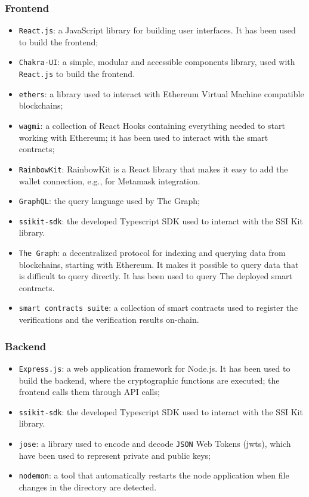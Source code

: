 \subsubsection{Frontend}
\begin{itemize}
    \setlength\itemsep{-0.1em}
    \item \texttt{React.js}: a JavaScript library for building user interfaces. It
    has been used to build the frontend;
    \item \texttt{Chakra-UI}: a simple, modular and accessible components library,
    used with \texttt{React.js} to build the frontend.
    \item \texttt{ethers}: a library used to interact with Ethereum Virtual
    Machine compatible blockchains;
    \item \texttt{wagmi}: a collection of React Hooks containing everything needed
    to start working with Ethereum; it has been used to interact with the smart
    contracts;
    \item \texttt{RainbowKit}: RainbowKit is a React library that makes it easy to 
    add the wallet connection, e.g., for Metamask integration.
    \item \texttt{GraphQL}: the query language used by The Graph;
    \item \texttt{ssikit-sdk}: the developed Typescript SDK used to interact with 
    the SSI Kit library.
    \item \texttt{The Graph}: a decentralized protocol for indexing and querying
    data from blockchains, starting with Ethereum. It makes it possible to query 
    data that is difficult to query directly. It has been used to query The
    deployed smart contracts.
    \item \texttt{smart contracts suite}: a collection of smart contracts used to
    register the verifications and the verification results on-chain.
\end{itemize}

\subsubsection{Backend}
\begin{itemize}
    \setlength\itemsep{-0.1em}
    \item \texttt{Express.js}: a web application framework for Node.js. It has been
    used to build the backend, where the cryptographic functions are executed; the frontend
    calls them through API calls;
    \item \texttt{ssikit-sdk}: the developed Typescript SDK used to interact with
    the SSI Kit library.
    \item \texttt{jose}: a library used to encode and decode \texttt{JSON} Web Tokens (\acrshort{jwt}s),
    which have been used to represent private and public keys;
    \item \texttt{nodemon}: a tool that automatically restarts the node application
    when file changes in the directory are detected.
\end{itemize}

